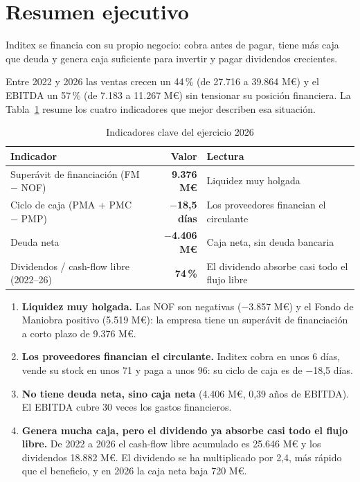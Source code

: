 \documentclass[11pt,a4paper]{article}
\newcommand{\mn}{\ensuremath{-}}                 %
\newcommand{\idea}[1]{\begin{ideabox}#1\end{ideabox}}
\begin{document}
\section*{Resumen ejecutivo}

\idea{Inditex se financia con su propio negocio: cobra antes de pagar, tiene más caja que deuda y
genera caja suficiente para invertir y pagar dividendos crecientes.}

Entre 2022 y 2026 las ventas crecen un 44\,\% (de 27.716 a 39.864 M€) y el EBITDA un 57\,\%
(de 7.183 a 11.267 M€) sin tensionar su posición financiera. La Tabla~\ref{tab:kpi} resume los
cuatro indicadores que mejor describen esa situación.

\begin{table}[H]
  \centering
  \caption{Indicadores clave del ejercicio 2026}
  \label{tab:kpi}
  \begin{tabular}{@{}l r l@{}}
    \toprule
    \color{navy}\textbf{Indicador} & \color{navy}\textbf{Valor} & \color{navy}\textbf{Lectura} \\
    \midrule
    Superávit de financiación (FM \mn{} NOF) & \textbf{\color{accent}9.376 M€} & Liquidez muy holgada \\
    Ciclo de caja (PMA + PMC \mn{} PMP)      & \textbf{\color{accent}\mn18,5 días} & Los proveedores financian el circulante \\
    Deuda neta                               & \textbf{\color{accent}\mn4.406 M€} & Caja neta, sin deuda bancaria \\
    Dividendos / cash-flow libre (2022--26)  & \textbf{\color{accent}74\,\%} & El dividendo absorbe casi todo el flujo libre \\
    \bottomrule
  \end{tabular}
\end{table}

\begin{enumerate}
  \item \textbf{Liquidez muy holgada.} Las NOF son negativas (\mn3.857 M€) y el Fondo de Maniobra positivo
        (5.519 M€): la empresa tiene un superávit de financiación a corto plazo de 9.376 M€.
  \item \textbf{Los proveedores financian el circulante.} Inditex cobra en unos 6 días, vende su stock en
        unos 71 y paga a unos 96: su ciclo de caja es de \mn18,5 días.
  \item \textbf{No tiene deuda neta, sino caja neta} (4.406 M€, 0,39 años de EBITDA). El EBITDA cubre
        30 veces los gastos financieros.
  \item \textbf{Genera mucha caja, pero el dividendo ya absorbe casi todo el flujo libre.} De 2022 a 2026
        el cash-flow libre acumulado es 25.646 M€ y los dividendos 18.882 M€. El dividendo se ha
        multiplicado por 2,4, más rápido que el beneficio, y en 2026 la caja neta baja 720 M€.
\end{enumerate}
\end{document}
